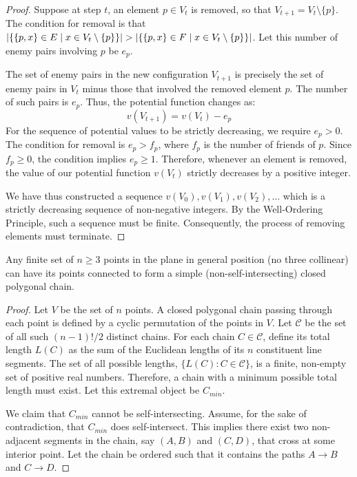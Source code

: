 \begin{theorem}
\begin{proof}
Suppose at step $t$, an element $p \in V_t$ is removed, so that $V_{t+1} = V_t \setminus \{p\}$. The condition for removal is that $\left| \{\{p,x\} \in E \mid x \in V_t \setminus \{p\}\} \right| > \left| \{\{p,x\} \in F \mid x \in V_t \setminus \{p\}\} \right|$. Let this number of enemy pairs involving $p$ be $e_p$.

The set of enemy pairs in the new configuration $V_{t+1}$ is precisely the set of enemy pairs in $V_t$ minus those that involved the removed element $p$. The number of such pairs is $e_p$. Thus, the potential function changes as:
$$ v(V_{t+1}) = v(V_t) - e_p $$
For the sequence of potential values to be strictly decreasing, we require $e_p > 0$. The condition for removal is $e_p > f_p$, where $f_p$ is the number of friends of $p$. Since $f_p \ge 0$, the condition implies $e_p \ge 1$.
Therefore, whenever an element is removed, the value of our potential function $v(V_t)$ strictly decreases by a positive integer.

We have thus constructed a sequence $v(V_0), v(V_1), v(V_2), \dots$ which is a strictly decreasing sequence of non-negative integers. By the Well-Ordering Principle, such a sequence must be finite. Consequently, the process of removing elements must terminate.
\end{proof}

\begin{proposition}
Any finite set of $n \ge 3$ points in the plane in general position (no three collinear) can have its points connected to form a simple (non-self-intersecting) closed polygonal chain.
\end{proposition}
\begin{proof}
Let $V$ be the set of $n$ points. A closed polygonal chain passing through each point is defined by a cyclic permutation of the points in $V$. Let $\mathcal{C}$ be the set of all such $(n-1)!/2$ distinct chains.
For each chain $C \in \mathcal{C}$, define its total length $L(C)$ as the sum of the Euclidean lengths of its $n$ constituent line segments. The set of all possible lengths, $\{L(C) : C \in \mathcal{C}\}$, is a finite, non-empty set of positive real numbers. Therefore, a chain with a minimum possible total length must exist. Let this extremal object be $C_{min}$.

We claim that $C_{min}$ cannot be self-intersecting.
Assume, for the sake of contradiction, that $C_{min}$ does self-intersect. This implies there exist two non-adjacent segments in the chain, say $(A,B)$ and $(C,D)$, that cross at some interior point. Let the chain be ordered such that it contains the paths $A \to B$ and $C \to D$.


\end{proof}
\end{theorem}
